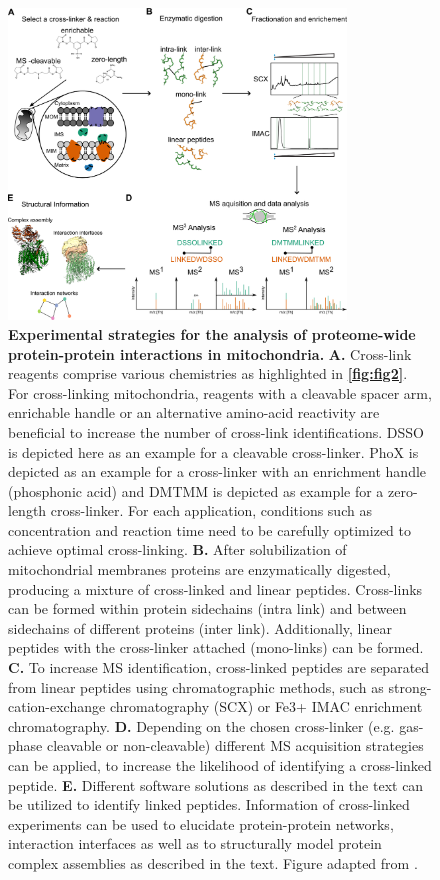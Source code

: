 \begin{figure}[hbt!]
    \center
    \includegraphics[width=0.8\textwidth]{Chapter.1/Figures/Figure3.png} 
    \caption{\textbf{Experimental strategies for the analysis of proteome-wide protein-protein interactions in mitochondria.} \textbf{A.} Cross-link reagents comprise various chemistries as highlighted in \textbf{\autoref{fig:fig2}}. For cross-linking mitochondria, reagents with a cleavable spacer arm, enrichable handle or an alternative amino-acid reactivity are beneficial to increase the number of cross-link identifications. DSSO is depicted here as an example for a cleavable cross-linker. PhoX is depicted as an example for a cross-linker with an enrichment handle (phosphonic acid) and DMTMM is depicted as example for a zero-length cross-linker. For each application, conditions such as concentration and reaction time need to be carefully optimized to achieve optimal cross-linking. \textbf{B.} After solubilization of mitochondrial membranes proteins are enzymatically digested, producing a mixture of cross-linked and linear peptides. Cross-links can be formed within protein sidechains (intra link) and between sidechains of different proteins (inter link). Additionally, linear peptides with the cross-linker attached (mono-links) can be formed. \textbf{C.} To increase MS identification, cross-linked peptides are separated from linear peptides using chromatographic methods, such as strong-cation-exchange chromatography (SCX) or Fe3+ IMAC enrichment chromatography. \textbf{D.} Depending on the chosen cross-linker (e.g. gas-phase cleavable or non-cleavable) different MS acquisition strategies can be applied, to increase the likelihood of identifying a cross-linked peptide. \textbf{E.} Different software solutions as described in the text can be utilized to identify linked peptides. Information of cross-linked experiments can be used to elucidate protein-protein networks, interaction interfaces as well as to structurally model protein complex assemblies as described in the text. Figure adapted from \cite{Hevler_2021b}.}
    \label{fig:fig3}
\end{figure}

